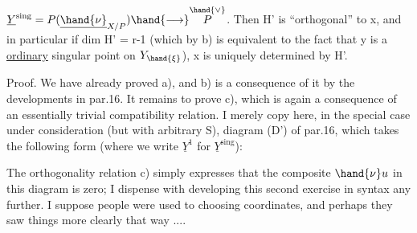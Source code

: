 
$\underline{Y}^{\mathrm{sing}} = P(\underline{\hand{\nu}}_{X/P}) \hand{\longrightarrow} \overset{\hand{\vee}}{P}$. Then H' is “orthogonal” to x, and in particular
if dim H' = r-1 (which by b) is equivalent to the fact that 
y is a  \uline{ordinary} singular point on $Y_{\hand{\xi}}$), x is uniquely determined
by H'.

Proof. We have already proved a), and b) is a consequence of it
by the developments in par.16. It remains to prove c), which is
again a consequence of an essentially trivial compatibility
relation. I merely copy here, in the special case under
consideration (but with arbitrary S), diagram (D') of par.16, which
takes the following form (where we write $\underline{Y}^1$ for $\underline{Y}^{\mathrm{sing}}$):


The orthogonality relation c) simply expresses that the composite
$\hand{\nu}u$ in this diagram is zero; I dispense with developing
this second exercise in syntax any further. I suppose people were
used to choosing coordinates, and perhaps they saw things more
clearly that way ....

